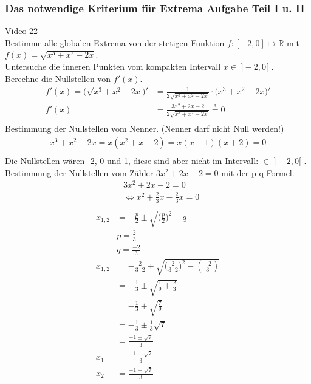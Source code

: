 \subsubsection{Das notwendige Kriterium für Extrema Aufgabe Teil I u. II}
\href{https://youtu.be/s-gd2f4tDws}{Video 22}\\
Bestimme alle globalen Extrema von der stetigen Funktion $ f:[-2,0]\longmapsto \mathbb{R} $ mit $ f(x)=\sqrt{x^3+x^2-2x} $.\\
Untersuche die inneren Punkten vom kompakten Intervall $x\in\; ]-2,0[  $ .\vspace*{4mm}\\
Berechne die Nullstellen von $ f'(x) $.\\
\begin{align*}
f'(x)=\bigg(\sqrt{x^3+x^2-2x}\bigg)'&=\frac{1}{2\sqrt{x^3+x^2-2x}}\cdot \bigg(x^3+x^2-2x\bigg)'\\
f'(x)&=\frac{3x^2+2x-2}{2\sqrt{x^3+x^2-2x}}\overset{!}{=} 0\\
\end{align*}
Bestimmung der Nullstellen vom Nenner. (Nenner darf nicht Null werden!)\\
\begin{align*}
x^3+x^2-2x=x(x^2+x-2)=x(x-1)(x+2)=0\\
\end{align*}
Die Nullstellen wären -2, 0 und 1, diese sind aber nicht im Intervall: $ \in \;]-2,0[  $ .\vspace*{4mm}\\
Bestimmung der Nullstellen vom Zähler $3x^2+2x-2=0 $ mit der p-q-Formel.\\
\begin{align*}
&3x^2+2x-2=0\\
&\Leftrightarrow x^2+\frac{2}{3}x-\frac{2}{3}x=0\\
\end{align*}
\begin{align*}
x_{1,2}&=-\frac{p}{2}\pm \sqrt{\bigg(\frac{p}{2}\bigg)^2-q}\\
&p=\frac{2}{3}\\
&q=\frac{-2}{3}\\
x_{1,2}&=-\frac{2}{3\cdot 2}\pm\sqrt{\bigg(\frac{2}{3\cdot2}\bigg)^2-(\frac{-2}{3})}\\
&=-\frac{1}{3}\pm\sqrt{\frac{1}{9}+\frac{2}{3}}\\
&=-\frac{1}{3}\pm\sqrt{\frac{7}{9}}\\
&=-\frac{1}{3}\pm \frac{1}{3}\sqrt{7}\\
&=\frac{-1\pm \sqrt{7}}{3}\\
x_1&=\frac{-1- \sqrt{7}}{3}\\
x_2&=\frac{-1+ \sqrt{7}}{3}\\
\end{align*}
